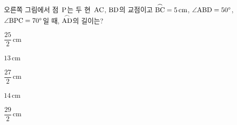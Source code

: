 \noindent\begin{minipage}[t]{0.58\linewidth}\vspace{0pt}\raggedright 오른쪽 그림에서 점~$\mathrm{P}$는 두 현~$\mathrm{AC}$, $\mathrm{BD}$의 교점이고 $\overset{\frown}{\mathrm{BC}}=5\,\mathrm{cm}$, $\angle\mathrm{ABD}=50^\circ$, $\angle\mathrm{BPC}=70^\circ$일 때, $\overset{\frown}{\mathrm{AD}}$의 길이는?\end{minipage}\hfill\begin{minipage}[t]{0.4\linewidth}\vspace{0pt}\centering \resizebox{\ifdim\width>\linewidth\linewidth\else\width\fi}{!}{}\end{minipage}\par
\begin{choicesii}{\rule[-3ex]{0pt}{8ex}$\dfrac{25}{2}\,\mathrm{cm}$}{\rule[-3ex]{0pt}{8ex}$13\,\mathrm{cm}$}{\rule[-3ex]{0pt}{8ex}$\dfrac{27}{2}\,\mathrm{cm}$}{\rule[-3ex]{0pt}{8ex}$14\,\mathrm{cm}$}{\rule[-3ex]{0pt}{8ex}$\dfrac{29}{2}\,\mathrm{cm}$}\end{choicesii}
